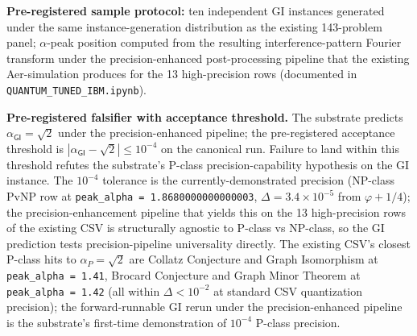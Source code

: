 \documentclass[11pt,a4paper]{amsart}
\theoremstyle{plain}
\theoremstyle{definition}
\begin{document}
\textbf{Pre-registered sample protocol:} ten independent GI instances generated under the same instance-generation distribution as the existing 143-problem panel; $\alpha$-peak position computed from the resulting interference-pattern Fourier transform under the precision-enhanced post-processing pipeline that the existing Aer-simulation produces for the 13 high-precision rows (documented in \texttt{QUANTUM\_TUNED\_IBM.ipynb}).

\textbf{Pre-registered falsifier with acceptance threshold.} The substrate predicts $\alpha_{\textsf{GI}} = \sqrt{2}$ under the precision-enhanced pipeline; the pre-registered acceptance threshold is $|\alpha_{\textsf{GI}} - \sqrt{2}| \le 10^{-4}$ on the canonical run. Failure to land within this threshold refutes the substrate's P-class precision-capability hypothesis on the GI instance. The $10^{-4}$ tolerance is the currently-demonstrated precision (NP-class PvNP row at \texttt{peak\_alpha = 1.8680000000000003}, $\Delta = 3.4 \times 10^{-5}$ from $\varphi + 1/4$); the precision-enhancement pipeline that yields this on the 13 high-precision rows of the existing CSV is structurally agnostic to P-class vs NP-class, so the GI prediction tests precision-pipeline universality directly. The existing CSV's closest P-class hits to $\alpha_{P} = \sqrt{2}$ are Collatz Conjecture and Graph Isomorphism at \texttt{peak\_alpha = 1.41}, Brocard Conjecture and Graph Minor Theorem at \texttt{peak\_alpha = 1.42} (all within $\Delta < 10^{-2}$ at standard CSV quantization precision); the forward-runnable GI rerun under the precision-enhanced pipeline is the substrate's first-time demonstration of $10^{-4}$ P-class precision.
\end{document}

